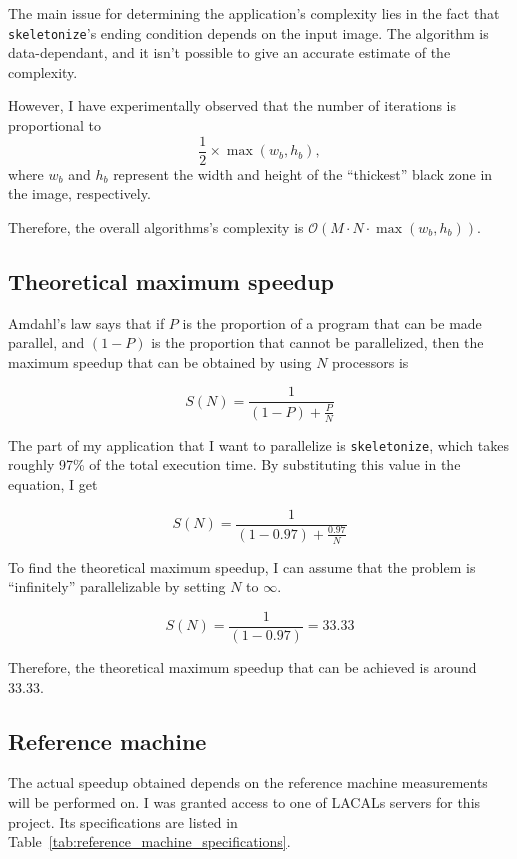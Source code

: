 \documentclass[11pt,a4paper]{article}
\begin{document}
            The main issue for determining the application's complexity lies in the fact that \verb+skeletonize+'s ending condition depends on the input image.
            The algorithm is data-dependant, and it isn't possible to give an accurate estimate of the complexity.

            However, I have experimentally observed that the number of iterations is proportional to $$\frac{1}{2} \times \max(w_{b}, h_{b}),$$ where $w_{b}$ and $h_{b}$ represent the width and height of the ``thickest'' black zone in the image, respectively.

            Therefore, the overall algorithms's complexity is $\mathcal{O}(M \cdot N \cdot \max(w_{b}, h_{b}))$.

        \subsection{Theoretical maximum speedup}
            \label{sec:theoretical_maximum_speedup}
            Amdahl's law says that if $P$ is the proportion of a program that can be made parallel, and $(1-P)$ is the proportion that cannot be parallelized, then the maximum speedup that can be obtained by using $N$ processors is

            $$ S(N) = \frac{1}{(1-P) + \frac{P}{N}} $$

            The part of my application that I want to parallelize is \verb+skeletonize+, which takes roughly 97\% of the total execution time.
            By substituting this value in the equation, I get

            $$ S(N) = \frac{1}{(1-0.97) + \frac{0.97}{N}} $$

            To find the theoretical maximum speedup, I can assume that the problem is ``infinitely'' parallelizable by setting $N$ to $\infty$.

            $$ S(N) = \frac{1}{(1-0.97)} = 33.33 $$

            Therefore, the theoretical maximum speedup that can be achieved is around 33.33.

        \subsection{Reference machine}
            The actual speedup obtained depends on the reference machine measurements will be performed on.
            I was granted access to one of LACALs servers for this project.
            Its specifications are listed in Table~\ref{tab:reference_machine_specifications}.
\end{document}
